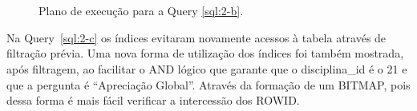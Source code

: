 \documentclass[a4paper,12pt]{article}
\begin{document}
\begin{figure}[hpt]
   \begin{center}
      \\
      \\
   \end{center}
   \caption{Plano de execução para a Query \ref{sql:2-b}.}
   \label{fig:plano_2-b}
\end{figure}

Na Query~\ref{sql:2-c} os índices evitaram novamente acessos à tabela através
de filtração prévia. Uma nova forma de utilização dos índices 
foi também mostrada, após filtragem, ao facilitar o AND lógico que garante
que o disciplina\_id é o 21 e que a pergunta é ``Apreciação Global''. Através da formação
de um BITMAP, pois dessa forma é mais fácil verificar a intercessão dos ROWID.
\end{document}
